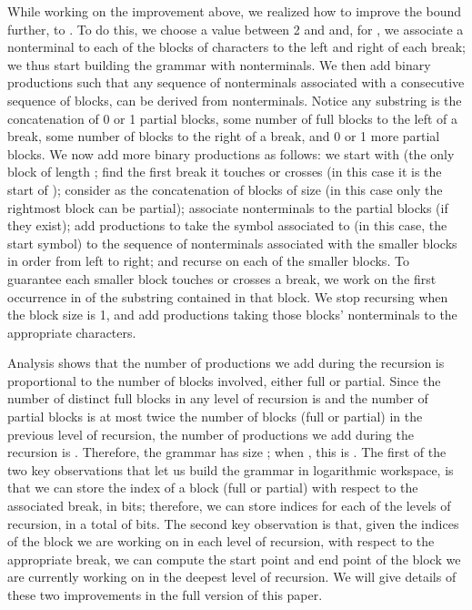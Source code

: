 \documentclass[runningheads]{llncs}
\begin{document}
While working on the improvement above, we realized how to improve the bound further, to .  To do this, we choose a value  between 2 and  and, for , we associate a nonterminal to each of the  blocks of  characters to the left and right of each break; we thus start building the grammar with  nonterminals.  We then add  binary productions such that any sequence of nonterminals associated with a consecutive sequence of blocks, can be derived from  nonterminals.  Notice any substring is the concatenation of 0 or 1 partial blocks, some number of full blocks to the left of a break, some number of blocks to the right of a break, and 0 or 1 more partial blocks.  We now add more binary productions as follows: we start with  (the only block of length ; find the first break it touches or crosses (in this case it is the start of ); consider  as the concatenation of blocks of size  (in this case only the rightmost block can be partial); associate nonterminals to the partial blocks (if they exist); add  productions to take the symbol associated to  (in this case, the start symbol) to the sequence of nonterminals associated with the smaller blocks in order from left to right; and recurse on each of the smaller blocks.  To guarantee each smaller block touches or crosses a break, we work on the first occurrence in  of the substring contained in that block.  We stop recursing when the block size is 1, and add  productions taking those blocks' nonterminals to the appropriate characters.

Analysis shows that the number of productions we add during the recursion is proportional to the number of blocks involved, either full or partial.  Since the number of distinct full blocks in any level of recursion is  and the number of partial blocks is at most twice the number of blocks (full or partial) in the previous level of recursion, the number of productions we add during the recursion is .  Therefore, the grammar has size ; when , this is .  The first of the two key observations that let us build the grammar in logarithmic workspace, is that we can store the index of a block (full or partial) with respect to the associated break, in  bits; therefore, we can store  indices for each of the  levels of recursion, in a total of  bits.  The second key observation is that, given the indices of the block we are working on in each level of recursion, with respect to the appropriate break, we can compute the start point and end point of the block we are currently working on in the deepest level of recursion.  We will give details of these two improvements in the full version of this paper.
\end{document}
